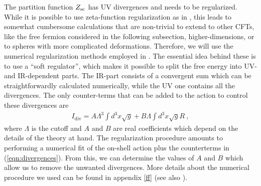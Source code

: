 \documentclass[12pt]{article}
\numberwithin{equation}{section}
\newcommand{\req}[1]{(\ref{#1})} %
\begin{document}
The partition function $Z_{\rm{sc}}$ has UV divergences and needs to be regularized. While it is possible to use zeta-function regularization as in \cite{Dowker:1998pi,Hartnoll:2005yc}, this leads to somewhat cumbersome calculations that are non-trivial to extend to other CFTs, like the free fermion considered in the following subsection, higher-dimensions, or to spheres with more complicated deformations. Therefore, we will use the numerical regularization methods employed in \cite{Anninos:2012ft,Anninos:2013rza,Bobev:2016sap}. The essential idea behind these is to use a ``soft regulator'', which makes it possible to split the free energy into UV- and IR-dependent parts. The IR-part consists of a convergent sum which can be straightforwardly calculated numerically, while the UV one contains all the divergences.
The only counter-terms that can be added to the action to control these divergences are
%
\begin{align}
I_{\textrm{div}}= A \Lambda^3\int d^3 x \sqrt{g} + B \Lambda\int d^3 x \sqrt{g} R \ , \label{eqn:divergences}
\end{align}
%
where $\Lambda$ is the cutoff and $A$ and $B$ are real coefficients which depend on the details of the theory at hand. 
The regularization procedure amounts to performing a numerical fit of the on-shell action plus the counterterms in \req{eqn:divergences}. From this, we can determine the values of $A$ and $B$ which allow us to remove the unwanted divergences. More details about the numerical procedure we used can be found in appendix \ref{ff} (see also \cite{Bobev:2016sap}).
\end{document}
